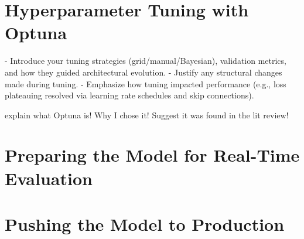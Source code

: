 \section{Hyperparameter Tuning with Optuna}
- Introduce your tuning strategies (grid/manual/Bayesian), validation metrics, and how they guided architectural evolution.
- Justify any structural changes made during tuning.
- Emphasize how tuning impacted performance (e.g., loss plateauing resolved via learning rate schedules and skip connections).

explain what Optuna is! Why I chose it! Suggest it was found in the lit review!
\section{Preparing the Model for Real-Time Evaluation}
\section{Pushing the Model to Production}